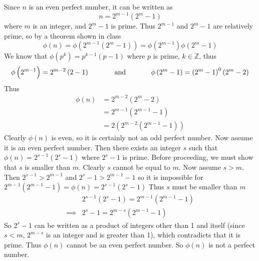 \documentclass{scrartcl}
\begin{document}
Since $n$ is an even perfect number, it can be written as $$n = 2^{m-1}\left(2^m-1\right)$$ where $m$ is an integer, and $2^m-1$ is prime. Thus $2^{m-1}$ and $2^m-1$ are relatively prime, so by a theorem shown in class $$\phi(n)=\phi\left(2^{m-1}\left(2^m-1\right)\right) = \phi\left(2^{m-1}\right)\phi\left(2^m-1\right)$$ We know that $\phi(p^k)=p^{k-1}(p-1)$ where $p$ is prime, $k\in\mathbb{Z}$, thus
$$\phi\left(2^{m-1}\right)=2^{m-2}\left(2-1\right) \text{\hspace{0.5in}and\hspace{0.5in}} \phi\left(2^m-1\right)=\left(2^m-1\right)^0\left(2^m-2\right)$$
Thus
\begin{align*}
  \phi(n) &= 2^{m-2}\left(2^m-2\right)\\
  &= 2^{m-1}\left(2^{m-1}-1\right)\\
  &= 2\left(2^{m-2}\left(2^{m-1}-1\right)\right)
\end{align*}
Clearly $\phi(n)$ is even, so it is certainly not an odd perfect number. Now assume it is an even perfect number. Then there exists an integer $s$ such that $\phi(n) = 2^{s-1}\left(2^s-1\right)$ where $2^s-1$ is prime. Before proceeding, we must show that $s$ is smaller than $m$. Clearly $s$ cannot be equal to $m$. Now assume $s>m$. Then $2^{s-1} > 2^{m-1}$ and $2^s-1 > 2^{m-1}-1$ so it is impossible for $2^{m-1}\left(2^{m-1}-1\right) = \phi(n) = 2^{s-1}\left(2^s-1\right)$ Thus $s$ must be smaller than $m$
\begin{align*}
  &2^{s-1}\left(2^s-1\right) = 2^{m-1}\left(2^{m-1}-1\right)\\
  \implies & 2^s-1 = 2^{m-s}\left(2^{m-1}-1\right)
\end{align*}
So $2^s-1$ can be written as a product of integers other than 1 and itself (since $s < m$, $2^{m-s}$ is an integer and is greater than 1), which contradicts that it is prime. Thus $\phi(n)$ cannot be an even perfect number. So $\phi(n)$ is not a perfect number.
\end{document}
